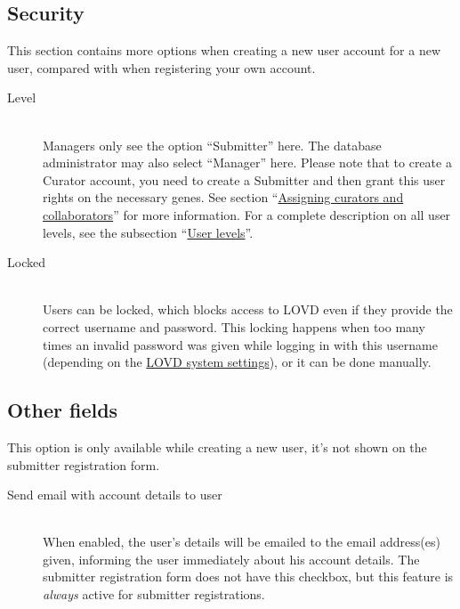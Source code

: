 \documentclass[a4paper,oneside,openany,12pt]{memoir}
\begin{document}
\pagebreak[4] %
\subsection{Security}
This section contains more options when creating a new user account for a new user, compared with when registering your own account.
\begin{description}
  \item[Level] \hfill \\
  Managers only see the option ``Submitter'' here.
  The database administrator may also select ``Manager'' here.
  Please note that to create a Curator account, you need to create a Submitter and then grant this user rights on the necessary genes.
  See section ``\hyperlink{sec:gene_assign_curators}{Assigning curators and collaborators}'' for more information.
  For a complete description on all user levels, see the subsection ``\hyperlink{ssec:user_levels}{User levels}''.
  \item[Locked] \hfill \\
  Users can be locked, which blocks access to LOVD even if they provide the correct username and password.
  This locking happens when too many times an invalid password was given while logging in with this username
   (depending on the \hyperlink{sec:system_settings}{LOVD system settings}), or it can be done manually.
\end{description}



\subsection{Other fields}
This option is only available while creating a new user, it's not shown on the submitter registration form.
\begin{description}
  \item[Send email with account details to user] \hfill \\
  When enabled, the user's details will be emailed to the email address(es) given, informing the user immediately about his account details.
  The submitter registration form does not have this checkbox, but this feature is \emph{always} active for submitter registrations.
\end{description}
\end{document}
